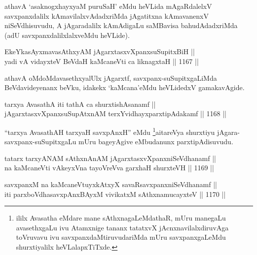 \begin{artha}
athavA `asaknogxhayxyaM puruSaH' eMdu heVLida mAgaRdalelxV savxpanxdalilx kAmavilalxvAdadxriMda jAgatitxna kAmavanenxV niSeVdhisuvudu, A jAgaradalilx kAmAdigaLu saMBavisa bahudAdadxriMda (adU savxpanxdalilxlalxveMdu heVLide).
\end{artha}


\begin{shl}
EkeYkasAyxmavasAthxyAM jAgarxtasxvXpanxsuSupitxBiH || \\
yadi vA vidayxteV BeVdaH kaMcaneVti ca liknagxtaH ||  1167 ||  
\end{shl}

\begin{artha}
athavA oMdoMdavasethxyalUlx jAgarxtf, savxpanx-suSupitxgaLiMda BeVdavideyenanx beVku, idakekx `kaMcana'eMdu heVLidedxV gamakavAgide.
\end{artha}


\begin{shl}
tarxya AvasathA iti tathA ca shurxtishAsanamf || \\
jAgarxtasxvXpanxsuSupAtxnAM terxYvidhayxparxtipAdakamf ||  1168 || 
\end{shl}

\begin{artha}
``tarxya AvasathAH tarxyaH savxpAnxH'' eMdu \footnote{ililx Avasatha eMdare mane sAthxnagaLeMdathaR, mUru manegaLu avasethxgaLu ivu Atamxnige tananx tatatxvX jAcnxnavilalxdiruvAga toVruvavu ivu savxpanxdaMtiruvudariMda mUru savxpanxgaLeMdu shurxtiyalilx heVLalapxTiTxde.}aitareVya shurxtiyu jAgara-savxpanx-suSupitxgaLu mUru bageyAgive eMbudanunx parxtipAdisuvudu.
\end{artha}


\begin{shl}
tatarx tarxyANAM sAthxnAnAM jAgarxtasxvXpanxniSeVdhanamf || \\
na kaMcaneVti vAkeyxVna tayoVreVva garxhaH shurxteVH ||  1169 ||  
\end{shl}
				
\begin{shl}
savxpanxM na kaMcaneVtuyxkAtxyX savaRsavxpanxniSeVdhanamf || \\
iti parxboVdhasavxpAnxBAyxM vivikatxM sAthxnamucayxteV ||  1170 ||  
\end{shl}

